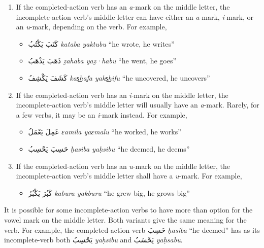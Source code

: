 \documentclass[
  10pt,
]{book}
\providecommand{\tightlist}{%
  \setlength{\itemsep}{0pt}\setlength{\parskip}{0pt}}
\begin{document}
\begin{enumerate}
\def\labelenumi{\arabic{enumi}.}
\item
  If the completed-action verb has an \emph{a}-mark on the middle letter, the incomplete-action verb's middle letter can have either an \emph{a}-mark, \emph{i}-mark, or an \emph{u}-mark, depending on the verb. For example,

  \begin{itemize}
  \tightlist
  \item
    \foreignlanguage{arabic}{کَتَبَ يَکْتُبُ} \emph{kataba yaktubu} \enquote{he wrote, he writes}
  \item
    \foreignlanguage{arabic}{ذَهَبَ يَذْهَبُ} \emph{ẕahaba yaẕ·habu} \enquote{he went, he goes}
  \item
    \foreignlanguage{arabic}{کَشَفَ يَکْشِفُ} \emph{kas͟hafa yaks͟hifu} \enquote{he uncovered, he uncovers}
  \end{itemize}
\item
  If the completed-action verb has an \emph{i}-mark on the middle letter, the incomplete-action verb's middle letter will usually have an \emph{a}-mark. Rarely, for a few verbs, it may be an \emph{i}-mark instead. For example,

  \begin{itemize}
  \tightlist
  \item
    \foreignlanguage{arabic}{عَمِلَ يَعْمَلُ} \emph{ɛamila yaɛmalu} \enquote{he worked, he works}
  \item
    \foreignlanguage{arabic}{حَسِبَ يَحْسِبُ} \emph{ḥasiba yaḥsibu} \enquote{he deemed, he deems}
  \end{itemize}
\item
  If the completed-action verb has an \emph{u}-mark on the middle letter, the incomplete-action verb's middle letter shall have a \emph{u}-mark. For example,

  \begin{itemize}
  \tightlist
  \item
    \foreignlanguage{arabic}{کَبُرَ يَکْبُرُ} \emph{kabura yakburu} \enquote{he grew big, he grows big}
  \end{itemize}
\end{enumerate}

It is possible for some incomplete-action verbs to have more than option for the vowel mark on the middle letter. Both variants give the same meaning for the verb. For example, the completed-action verb \foreignlanguage{arabic}{حَسِبَ} \emph{ḥasiba} \enquote{he deemed} has as its incomplete-verb both \foreignlanguage{arabic}{يَحْسِبُ} \emph{yaḥsibu} and \foreignlanguage{arabic}{يَحْسَبُ} \emph{yaḥsabu}.
\end{document}
